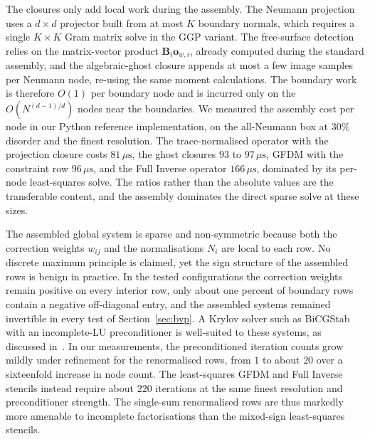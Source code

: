 \documentclass[preprint,review,12pt]{elsarticle}
\newcommand{\Bi}{\mathbf{B}_i}
\newcommand{\ow}{\mathbf{o}_{w,i}}
\begin{document}
The closures only add local work during the assembly.
The Neumann projection uses a $d\times d$ projector built from at most $K$ boundary normals, which requires a single $K\times K$ Gram matrix solve in the GGP variant.
The free-surface detection relies on the matrix-vector product $\Bi\ow$, already computed during the standard assembly, and the algebraic-ghost closure appends at most a few image samples per Neumann node, re-using the same moment calculations.
The boundary work is therefore $O(1)$ per boundary node and is incurred only on the $O(N^{(d-1)/d})$ nodes near the boundaries.
We measured the assembly cost per node in our Python reference implementation, on the all-Neumann box at $30\%$ disorder and the finest resolution.
The trace-normalised operator with the projection closure costs $81\,\mu\mathrm{s}$, the ghost closures $93$ to $97\,\mu\mathrm{s}$, GFDM with the constraint row $96\,\mu\mathrm{s}$, and the Full Inverse operator $166\,\mu\mathrm{s}$, dominated by its per-node least-squares solve.
The ratios rather than the absolute values are the transferable content, and the assembly dominates the direct sparse solve at these sizes.

The assembled global system is sparse and non-symmetric because both the correction weights $w_{ij}$ and the normalisations $N_i$ are local to each row.
No discrete maximum principle is claimed, yet the sign structure of the assembled rows is benign in practice.
In the tested configurations the correction weights remain positive on every interior row, only about one percent of boundary rows contain a negative off-diagonal entry, and the assembled systems remained invertible in every test of Section~\ref{sec:bvp}.
A Krylov solver such as BiCGStab with an incomplete-LU preconditioner is well-suited to these systems, as discussed in~\cite{Basic2018}.
In our measurements, the preconditioned iteration counts grow mildly under refinement for the renormalised rows, from $1$ to about $20$ over a sixteenfold increase in node count.
The least-squares GFDM and Full Inverse stencils instead require about $220$ iterations at the same finest resolution and preconditioner strength.
The single-sum renormalised rows are thus markedly more amenable to incomplete factorisations than the mixed-sign least-squares stencils.
\end{document}
